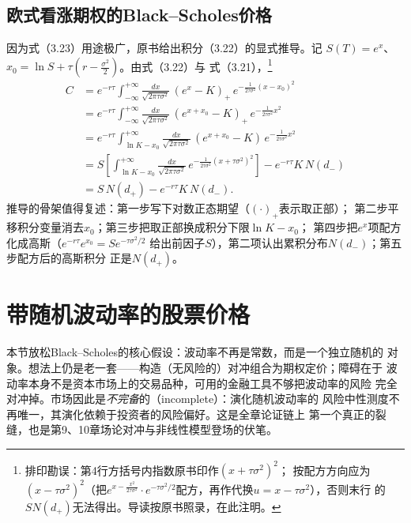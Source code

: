 \subsection*{欧式看涨期权的Black--Scholes价格}

因为式（3.23）用途极广，原书给出积分（3.22）的显式推导。记
$S(T)=e^{x}$、$x_0=\ln S+\tau(r-\frac{\sigma^{2}}{2})$。由式（3.22）与
式（3.21），\footnote{排印勘误：第4行方括号内指数原书印作$(x+\tau\sigma^{2})^{2}$；
按配方方向应为$(x-\tau\sigma^{2})^{2}$（把$e^{x-\frac{x^{2}}{2\tau\sigma^{2}}}
\cdot e^{-\tau\sigma^{2}/2}$配方，再作代换$u=x-\tau\sigma^{2}$），否则末行
的$SN(d_{+})$无法得出。导读按原书照录，在此注明。}
\begin{align*}
C&=e^{-r\tau}\int_{-\infty}^{+\infty}\frac{dx}{\sqrt{2\pi\tau\sigma^{2}}}
\,(e^{x}-K)_{+}\,e^{-\frac{1}{2\tau\sigma^{2}}(x-x_{0})^{2}}\\
&=e^{-r\tau}\int_{-\infty}^{+\infty}\frac{dx}{\sqrt{2\pi\tau\sigma^{2}}}
\,(e^{x+x_{0}}-K)_{+}\,e^{-\frac{1}{2\tau\sigma^{2}}x^{2}}\\
&=e^{-r\tau}\int_{\ln K-x_{0}}^{+\infty}\frac{dx}{\sqrt{2\pi\tau\sigma^{2}}}
\,(e^{x+x_{0}}-K)\,e^{-\frac{1}{2\tau\sigma^{2}}x^{2}}\\
&=S\left[\int_{\ln K-x_{0}}^{+\infty}\frac{dx}{\sqrt{2\pi\tau\sigma^{2}}}
\,e^{-\frac{1}{2\tau\sigma^{2}}(x+\tau\sigma^{2})^{2}}\right]
-e^{-r\tau}K\,N(d_{-})\\
&=S\,N(d_{+})-e^{-r\tau}K\,N(d_{-}).
\tag{3.25}
\end{align*}推导的骨架值得复述：第一步写下对数正态期望（$(\cdot)_{+}$表示取正部）；
第二步平移积分变量消去$x_0$；第三步把取正部换成积分下限$\ln K-x_0$；
第四步把$e^{x}$项配方化成高斯（$e^{-r\tau}e^{x_0}=Se^{-\tau\sigma^{2}/2}$
给出前因子$S$），第二项认出累积分布$N(d_-)$；第五步配方后的高斯积分
正是$N(d_+)$。

\section{带随机波动率的股票价格}

本节放松Black--Scholes的核心假设：波动率不再是常数，而是一个独立随机的
对象。想法上仍是老一套——构造（无风险的）对冲组合为期权定价；障碍在于
波动率本身不是资本市场上的交易品种，可用的金融工具不够把波动率的风险
完全对冲掉。市场因此是\emph{不完备}的（incomplete）：演化随机波动率的
风险中性测度不再唯一，其演化依赖于投资者的风险偏好。这是全章论证链上
第一个真正的裂缝，也是第9、10章场论对冲与非线性模型登场的伏笔。

